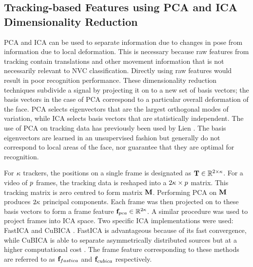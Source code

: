 
\subsection{Tracking-based Features using PCA and ICA Dimensionality Reduction}

\ac{PCA} and \ac{ICA} can be used to separate information due to changes in pose from information due to local deformation. This is necessary because raw features from tracking contain translations and other movement information that is not necessarily relevant to \ac{NVC} classification. Directly using raw features would result in poor recognition performance. These dimensionality reduction techniques subdivide a signal by projecting it on to a new set of basis vectors; the basis vectors in the case of \ac{PCA} correspond to a particular overall deformation of the face. \ac{PCA} selects eigenvectors that are the largest orthogonal modes of variation, while \ac{ICA} selects basis vectors that are statistically independent. The use of \ac{PCA} on tracking data has previously been used by Lien \etal \cite{Lien1998}.
The basis eigenvectors are learned in an unsupervised fashion but generally do not correspond to local areas of the face, nor guarantee that they are optimal for recognition.

For $\kappa$ trackers, the positions on a single frame is designated as $\textbf{T} \in \mathbb{R}^{2 \times \kappa}$. For a video of $p$ frames, the tracking data is reshaped into a $2\kappa \times p$ matrix. This tracking matrix is zero centred to form matrix $\textbf{M}$. Performing \ac{PCA} on $\textbf{M}$ produces $2\kappa$ principal components. Each frame was then projected on to these basis vectors to form a frame feature $\textbf{f}_{pca} \in \mathbb{R}^{2\kappa}$. A similar procedure was used to project frames into \ac{ICA} space. Two specific \ac{ICA} implementations were used: FastICA \cite{Hyvarinen1999} and CuBICA \cite{Blaschke2004}. FastICA is advantageous because of its fast convergence, while CuBICA is able to separate asymmetrically distributed sources but at a higher computational cost \cite{Wang05}. The frame feature corresponding to these methods are referred to as $\textbf{f}_{fastica}$ and $\textbf{f}_{cubica}$ respectively.

